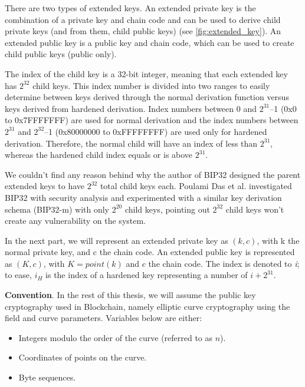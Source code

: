 There are two types of extended keys. An extended private key is the combination of a private key and chain code and can be used to derive child private keys (and from them, child public keys) (see \autoref{fig:extended_key}). An extended public key is a public key and chain code, which can be used to create child public keys (public only).

The index of the child key is a 32-bit integer, meaning that each extended key has $2^{32}$ child keys. This index number is divided into two ranges to easily determine between keys derived through the normal derivation function versus keys derived from hardened derivation. Index numbers between 0 and $2^{31}$–1 (0x0 to 0x7FFFFFFF) are used for normal derivation and the index numbers between $2^{31}$ and $2^{32}$–1 (0x80000000 to 0xFFFFFFFF) are used only for hardened derivation. Therefore, the normal child will have an index of less than $2^{31}$, whereas the hardened child index equals or is above  $2^{31}$.

We couldn’t find any reason behind why the author of BIP32 designed the parent extended keys to have $2^{32}$ total child keys each. Poulami Das et al.\cite{DBLP:conf/ccs/0003EFL021} investigated BIP32 with security analysis and experimented with a similar key derivation schema (BIP32-m) with only $2^{20}$ child keys, pointing out $2^{32}$ child keys won’t create any vulnerability on the system.

In the next part, we will represent an extended private key as $(k, c)$, with k the normal private key, and c the chain code. An extended public key is represented as $(K, c)$, with $K = point(k)$ and $c$ the chain code. The index is denoted to \textit{i}; to ease, $i_H$ is the index of a hardened key representing a number of $i+2^{31}$.

\bigskip
{\textbf{Convention}}. In the rest of this thesis, we will assume the public key cryptography used in Blockchain, namely elliptic curve cryptography using the field and curve parameters. Variables below are either:

\begin{itemize}
    \item Integers modulo the order of the curve (referred to as $n$).

    \item Coordinates of points on the curve.

    \item Byte sequences.
\end{itemize}

